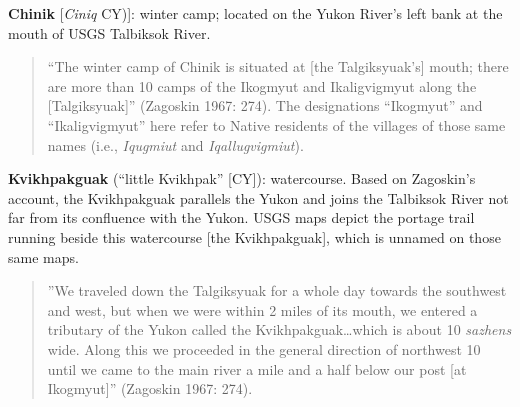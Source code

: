 \begin{hang}
\textbf{Chinik} [\textit{Ciniq} CY)]: winter camp; located on the Yukon River’s left bank at the mouth of USGS Talbiksok River.



\begin{quote}“The winter camp of Chinik is situated at [the Talgiksyuak’s] mouth; there are more than 10 camps of the Ikogmyut and Ikaligvigmyut along the [Talgiksyuak]” (Zagoskin 1967: 274). The designations “Ikogmyut” and “Ikaligvigmyut” here refer to Native residents of the villages of those same names (i.e., \textit{Iqugmiut} and \textit{Iqallugvigmiut}).
\end{quote}



\textbf{Kvikhpakguak} (“little Kvikhpak” [CY]): watercourse. Based on Zagoskin’s account, the Kvikhpakguak parallels the Yukon and joins the Talbiksok River not far from its confluence with the Yukon. USGS maps depict the portage trail running beside this watercourse [the Kvikhpakguak], which is unnamed on those same maps.



\begin{quote}”We traveled down the Talgiksyuak for a whole day towards the southwest and west, but when we were within 2 miles of its mouth, we entered a tributary of the Yukon called the Kvikhpakguak…which is about 10 \textit{sazhens} wide. Along this we proceeded in the general direction of northwest 10 until we came to the main river a mile and a half below our post [at Ikogmyut]” (Zagoskin 1967: 274).
\end{quote}



\end{hang}











\label{pratt-ch-end}
